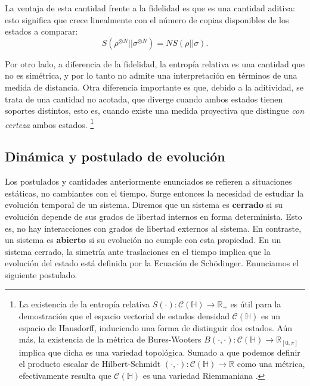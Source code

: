 \documentclass{report} %
\numberwithin{equation}{section}
\begin{document}
La ventaja de esta cantidad frente a la fidelidad es que es una cantidad aditiva: esto significa que crece linealmente con el número de copias disponibles de los estados a comparar: 
$$
S(\rho^{\otimes N}||\sigma^{\otimes N})=N S(\rho||\sigma).
$$

Por otro lado, a diferencia de la fidelidad, la entropía relativa es una cantidad que no es simétrica, y por lo tanto no admite una interpretación en términos de una medida de distancia. Otra diferencia importante es que, debido a la aditividad, se trata de una cantidad no acotada, que diverge cuando ambos estados tienen soportes distintos, esto es, cuando existe una medida proyectiva que distingue  \emph{con certeza} ambos estados. \footnote{ La existencia de la entropía relativa $S(\cdot): \mathcal{C}(\mathds{H}) \rightarrow \mathds{R}_{+}$ es útil para la demostración que el espacio vectorial de estados densidad $\mathcal{C}(\mathds{H})$ es un espacio de Hausdorff, induciendo una forma de distinguir dos estados. Aún más, la existencia de la métrica de Bures-Wooters $B(\cdot, \cdot): \mathcal{C}(\mathds{H}) \rightarrow \mathds{R}_{[0, \pi]}$ implica que dicha es una variedad topológica. Sumado a que podemos definir el producto escalar de Hilbert-Schmidt $(\cdot, \cdot) : \mathcal{C}(\mathds{H}) \rightarrow \mathds{R}$ como una métrica, efectivamente resulta que $\mathcal{C}(\mathds{H})$ es una variedad Riemmaniana \cite{NakaharaM, GoldbartStone, HoracioI}. }


\subsection{Din\'amica y postulado de evoluci\'on}
 
Los postulados y cantidades anteriormente enunciados se refieren a situaciones estáticas, no cambiantes con el tiempo. Surge entonces la necesidad de estudiar la evolución temporal de un sistema. Diremos que un sistema es \textbf{cerrado} si su evolución depende de sus grados de libertad internos en forma determinista. Esto es, no hay interacciones con grados de libertad externos al sistema. En contraste, un sistema es \textbf{abierto} si su evolución no cumple con esta propiedad. En un sistema cerrado, la simetría ante traslaciones en el tiempo implica que la evolución del estado está definida por la Ecuación de Sch\"odinger\cite{HeinzPetruccione}\cite{Sch35}. Enunciamos el siguiente postulado. 
\end{document}
